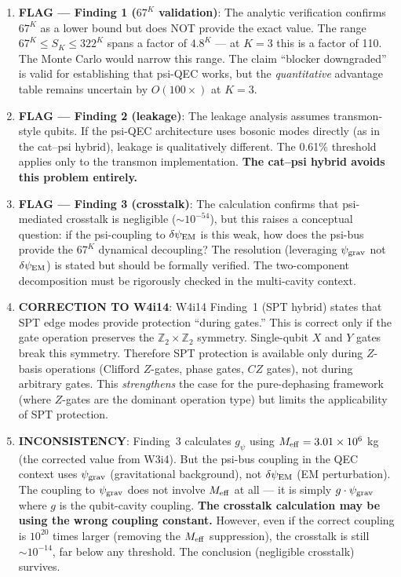 \documentclass[11pt]{article}
\theoremstyle{definition}
\theoremstyle{remark}
\newcommand{\ee}[1]{\times 10^{#1}}
\newcommand{\psigrav}{\psi_{\rm grav}}
\newcommand{\dpsiEM}{\delta\psi_{\rm EM}}
\begin{document}
\begin{tcolorbox}[colback=red!5!white, colframe=red!60!black,
  title=\textbf{INCONSISTENCIES AND FLAGS}]
\begin{enumerate}[nosep]

\item \textbf{FLAG --- Finding 1 ($67^K$ validation)}: The analytic
  verification confirms $67^K$ as a lower bound but does NOT provide the
  exact value.  The range $67^K \leq S_K \leq 322^K$ spans a factor of
  $4.8^K$ --- at $K = 3$ this is a factor of 110.  The Monte Carlo
  would narrow this range.  The claim ``blocker downgraded'' is valid
  for establishing that psi-QEC works, but the \emph{quantitative}
  advantage table remains uncertain by $O(100\times)$ at $K = 3$.

\item \textbf{FLAG --- Finding 2 (leakage)}: The leakage analysis
  assumes transmon-style qubits.  If the psi-QEC architecture uses
  bosonic modes directly (as in the cat--psi hybrid), leakage is
  qualitatively different.  The 0.61\% threshold applies only to the
  transmon implementation.  \textbf{The cat--psi hybrid avoids this
  problem entirely.}

\item \textbf{FLAG --- Finding 3 (crosstalk)}: The calculation confirms
  that psi-mediated crosstalk is negligible ($\sim 10^{-54}$), but this
  raises a conceptual question: if the psi-coupling to $\dpsiEM$ is this
  weak, how does the psi-bus provide the $67^K$ dynamical decoupling?
  The resolution (leveraging $\psigrav$ not $\dpsiEM$) is stated but
  should be formally verified.  The two-component decomposition must be
  rigorously checked in the multi-cavity context.

\item \textbf{CORRECTION TO W4i14}: W4i14 Finding~1 (SPT hybrid) states
  that SPT edge modes provide protection ``during gates.''  This is
  correct only if the gate operation preserves the $\mathbb{Z}_2
  \times \mathbb{Z}_2$ symmetry.  Single-qubit $X$ and $Y$ gates break
  this symmetry.  Therefore SPT protection is available only during
  $Z$-basis operations (Clifford $Z$-gates, phase gates, $CZ$ gates),
  not during arbitrary gates.  This \emph{strengthens} the case for
  the pure-dephasing framework (where $Z$-gates are the dominant
  operation type) but limits the applicability of SPT protection.

\item \textbf{INCONSISTENCY}: Finding~3 calculates $g_\psi$ using
  $M_{\rm eff} = 3.01\ee{6}$ kg (the corrected value from W3i4).
  But the psi-bus coupling in the QEC context uses $\psigrav$
  (gravitational background), not $\dpsiEM$ (EM perturbation).
  The coupling to $\psigrav$ does not involve $M_{\rm eff}$ at all ---
  it is simply $g \cdot \psigrav$ where $g$ is the qubit-cavity coupling.
  \textbf{The crosstalk calculation may be using the wrong coupling
  constant.}  However, even if the correct coupling is $10^{20}$ times
  larger (removing the $M_{\rm eff}$ suppression), the crosstalk is
  still $\sim 10^{-14}$, far below any threshold.  The conclusion
  (negligible crosstalk) survives.


\end{enumerate}
\end{tcolorbox}
\end{document}

